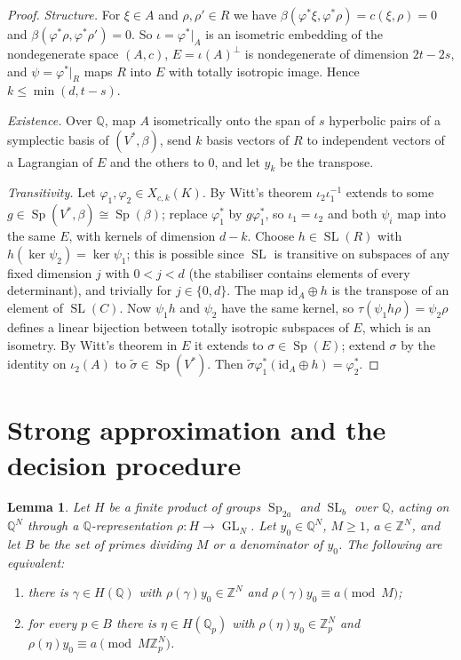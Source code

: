 \documentclass[11pt]{amsart}
\newtheorem{lemma}[theorem]{Lemma}
\theoremstyle{definition}
\theoremstyle{remark}
\newcommand{\Z}{\mathbb{Z}}
\newcommand{\Q}{\mathbb{Q}}
\newcommand{\Zp}{\mathbb{Z}_p}
\newcommand{\Qp}{\mathbb{Q}_p}
\newcommand{\Sp}{\operatorname{Sp}}
\newcommand{\SL}{\operatorname{SL}}
\newcommand{\GL}{\operatorname{GL}}
\begin{document}
\begin{proof}
\emph{Structure.} For $\xi\in A$ and $\rho,\rho'\in R$ we have
$\beta(\varphi^*\xi,\varphi^*\rho)=c(\xi,\rho)=0$ and
$\beta(\varphi^*\rho,\varphi^*\rho')=0$. So $\iota=\varphi^*|_A$ is an isometric
embedding of the nondegenerate space $(A,c)$, $E=\iota(A)^\perp$ is nondegenerate of
dimension $2t-2s$, and $\psi=\varphi^*|_R$ maps $R$ into $E$ with totally isotropic
image. Hence $k\le\min(d,t-s)$.

\emph{Existence.} Over $\Q$, map $A$ isometrically onto the span of $s$ hyperbolic
pairs of a symplectic basis of $(V^*,\beta)$, send $k$ basis vectors of $R$ to
independent vectors of a Lagrangian of $E$ and the others to $0$, and let $y_k$ be
the transpose.

\emph{Transitivity.} Let $\varphi_1,\varphi_2\in X_{c,k}(K)$. By Witt's theorem
$\iota_2\iota_1^{-1}$ extends to some $g\in\Sp(V^*,\beta)\cong\Sp(\beta)$; replace
$\varphi_1^*$ by $g\varphi_1^*$, so $\iota_1=\iota_2$ and both $\psi_i$ map into the
same $E$, with kernels of dimension $d-k$. Choose $h\in\SL(R)$ with
$h(\ker\psi_2)=\ker\psi_1$; this is possible since $\SL$ is transitive on subspaces
of any fixed dimension $j$ with $0<j<d$ (the stabiliser contains elements of every
determinant), and trivially for $j\in\{0,d\}$. The map $\mathrm{id}_A\oplus h$ is
the transpose of an element of $\SL(C)$. Now $\psi_1h$ and $\psi_2$ have the same
kernel, so $\tau(\psi_1h\rho)=\psi_2\rho$ defines a linear bijection between totally
isotropic subspaces of $E$, which is an isometry. By Witt's theorem in $E$ it
extends to $\sigma\in\Sp(E)$; extend $\sigma$ by the identity on $\iota_2(A)$ to
$\tilde\sigma\in\Sp(V^*)$. Then $\tilde\sigma\varphi_1^*(\mathrm{id}_A\oplus h)=
\varphi_2^*$.
\end{proof}

\section{Strong approximation and the decision procedure}\label{sec:decide}

\begin{lemma}\label{lem:SA}
Let $H$ be a finite product of groups $\Sp_{2a}$ and $\SL_b$ over $\Q$, acting on
$\Q^N$ through a $\Q$-representation $\rho\colon H\to\GL_N$. Let $y_0\in\Q^N$,
$M\ge1$, $a\in\Z^N$, and let $B$ be the set of primes dividing $M$ or a
denominator of $y_0$. The following are equivalent:
\begin{enumerate}[label=(\alph*)]
\item there is $\gamma\in H(\Q)$ with $\rho(\gamma)y_0\in\Z^N$ and
$\rho(\gamma)y_0\equiv a\pmod M$;
\item for every $p\in B$ there is $\eta\in H(\Qp)$ with $\rho(\eta)y_0\in\Zp^N$ and
$\rho(\eta)y_0\equiv a\pmod{M\Zp^N}$.
\end{enumerate}
\end{lemma}
\end{document}
